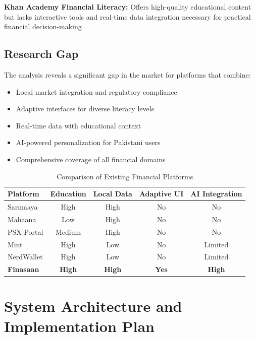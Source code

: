 \documentclass[conference]{IEEEtran}
\begin{document}
\textbf{Khan Academy Financial Literacy:} Offers high-quality educational content but lacks interactive tools and real-time data integration necessary for practical financial decision-making \cite{khan2023}.

\subsection{Research Gap}

The analysis reveals a significant gap in the market for platforms that combine:
\begin{itemize}
    \item Local market integration and regulatory compliance
    \item Adaptive interfaces for diverse literacy levels
    \item Real-time data with educational context
    \item AI-powered personalization for Pakistani users
    \item Comprehensive coverage of all financial domains
\end{itemize}

\begin{table}[htbp]
\caption{Comparison of Existing Financial Platforms}
\begin{center}
\begin{tabular}{|l|c|c|c|c|}
\hline
\textbf{Platform} & \textbf{Education} & \textbf{Local Data} & \textbf{Adaptive UI} & \textbf{AI Integration} \\ 
\hline
Sarmaaya & High & High & No & No \\ 
\hline
Mahaana & Low & High & No & No \\ 
\hline
PSX Portal & Medium & High & No & No \\ 
\hline
Mint & High & Low & No & Limited \\ 
\hline
NerdWallet & High & Low & No & Limited \\ 
\hline
\textbf{Finasaan} & \textbf{High} & \textbf{High} & \textbf{Yes} & \textbf{High} \\ 
\hline
\end{tabular}
\label{tab:comparison}
\end{center}
\end{table}

\section{System Architecture and Implementation Plan}
\end{document}
